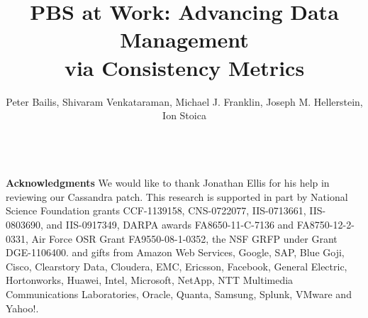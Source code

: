 \documentclass{sig-alternate}
\begin{document}
\title{PBS at Work: Advancing Data Management\\\hspace{4.3em}via Consistency Metrics}

\author{Peter Bailis, Shivaram Venkataraman, Michael J. Franklin, Joseph M. Hellerstein, Ion Stoica\\
\\
}

\sloppy
{}

\maketitle








\balance


\vspace{1em}
\noindent\textbf{Acknowledgments} We would like to thank Jonathan
Ellis for his help in reviewing our Cassandra patch.  This research is
supported in part by National Science Foundation grants CCF-1139158,
CNS-0722077, IIS-0713661, IIS-0803690, and IIS-0917349, DARPA awards
FA8650-11-C-7136 and FA8750-12-2-0331, Air Force OSR Grant
FA9550-08-1-0352, the NSF GRFP under Grant DGE-1106400. and gifts from
Amazon Web Services, Google, SAP, Blue Goji, Cisco, Clearstory Data,
Cloudera, EMC, Ericsson, Facebook, General Electric, Hortonworks,
Huawei, Intel, Microsoft, NetApp, NTT Multimedia Communications
Laboratories, Oracle, Quanta, Samsung, Splunk, VMware and Yahoo!.



\end{document}
